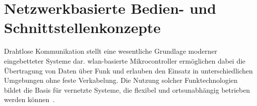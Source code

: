 \section{Netzwerkbasierte Bedien- und Schnittstellenkonzepte}
Drahtlose Kommunikation stellt eine wesentliche Grundlage moderner eingebetteter Systeme dar. 
\gls{wlan}-basierte Mikrocontroller ermöglichen dabei die Übertragung von Daten über Funk und erlauben den Einsatz in unterschiedlichen Umgebungen ohne feste Verkabelung. 
Die Nutzung solcher Funktechnologien bildet die Basis für vernetzte Systeme, die flexibel und ortsunabhängig betrieben werden können~\cite{hernandez2022wifi}.